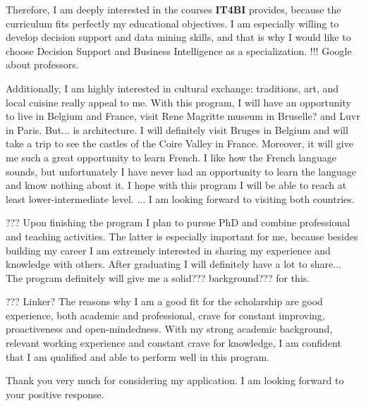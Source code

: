 \documentclass[a4paper,14pt]{extarticle}
\begin{document}
Therefore, I am deeply interested in the courses \textbf{IT4BI} provides, because the curriculum fits perfectly my educational objectives. I am especially willing to develop decision support and data mining skills, and that is why I would like to choose Decision Support and Business Intelligence as a specialization. !!! Google about professors.

Additionally, I am highly interested in cultural exchange: traditions, art, and local cuisine really appeal to me. With this program, I will have an opportunity to live in Belgium and France, visit Rene Magritte museum in Bruselle? and Luvr in Paris. But... is architecture. I will definitely visit Bruges in Belgium and will take a trip to see the castles of the Coire Valley in France. Moreover, it will give me such a great opportunity to learn French. I like how the French language sounds, but unfortunately I have never had an opportunity to learn the language and know nothing about it. I hope with this program I will be able to reach at least lower-intermediate level. ... I am looking forward to visiting both countries.

???
Upon finishing the program I plan to pursue PhD and combine professional and teaching activities. The latter is especially important for me, because besides building my career I am extremely interested in sharing my experience and knowledge with others. After graduating I will definitely have a lot to share... The program definitely will give me a solid??? background??? for this.

???
Linker? The reasons why I am a good fit for the scholarship are good experience, both academic and professional, crave for constant improving, proactiveness and open-mindedness. With my strong academic background, relevant working experience and constant crave for knowledge, I am confident that I am qualified and able to perform well in this program.

Thank you very much for considering my application. I am looking forward to your positive response.
\end{document}
